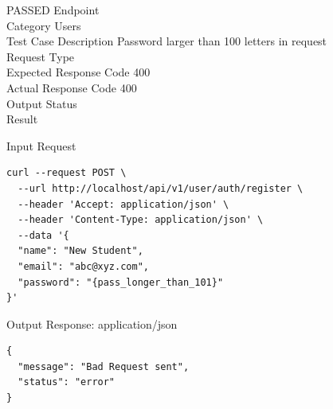 \begin{testcase}{56}{PASSED}
Endpoint \hfill {}\\
Category \hfill Users\\
Test Case Description \hfill Password larger than 100 letters in request\\

Request Type    \hfill {}\\
Expected Response Code    \hfill 400\\
Actual Response Code    \hfill 400\\

Output Status \hfill {}\\
Result \hfill {}

\begin{ipblock}{Input Request}
\begin{verbatim}
curl --request POST \
  --url http://localhost/api/v1/user/auth/register \
  --header 'Accept: application/json' \
  --header 'Content-Type: application/json' \
  --data '{
  "name": "New Student",
  "email": "abc@xyz.com",
  "password": "{pass_longer_than_101}"
}'
\end{verbatim}
\end{ipblock}

\begin{opblock}{Output Response: application/json}
\begin{verbatim}
{
  "message": "Bad Request sent",
  "status": "error"
}
\end{verbatim}
\end{opblock}
\end{testcase}

